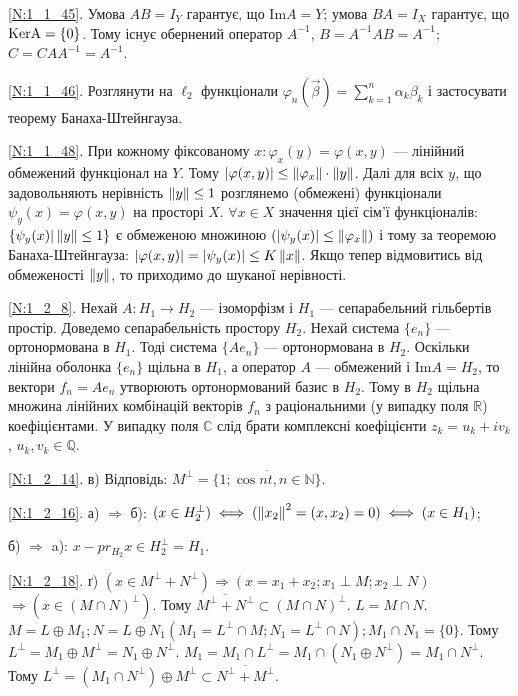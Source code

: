 \noindent\ref{N:1_1_45}. Умова $AB = I_Y$ гарантує, що $\mathrm{Im} A = Y$; умова $BA = I_X$
гарантує, що $\rm KerA = \{0\}$. Тому існує обернений оператор $A^{-1}$, $B = A^{-1}AB = A^{-1}$; $C = CAA^{-1} = A^{-1}$.

\noindent\ref{N:1_1_46}. Розглянути на $\ell_2$ функціонали $\varphi_n (\vec{\beta}) = \sum\limits_{k = 1}^{n} \alpha_k \beta_k$
і застосувати теорему Банаха-Штейнгауза.

\noindent\ref{N:1_1_48}. При кожному фіксованому $x: \varphi_x(y) = \varphi(x, y)$ --- лінійний обмежений функціонал на $Y$. Тому
$|\varphi(x, y)| \leq \left\lVert\varphi_x\right\rVert \cdot \left\lVert y\right\rVert$. Далі для всіх $y$, що задовольняють нерівність $\left\lVert y\right\rVert \leq 1$
розглянемо (обмежені) функціонали $\psi_y (x) = \varphi(x, y)$ на просторі $X$. $\forall x \in X$ значення цієї
сім'ї функціоналів: $\{\psi_y (x) | \left\lVert y\right\rVert \leq 1\}$ є обмеженою множиною $(|\psi_y(x)| \leq \left\lVert\varphi_x\right\rVert)$ і тому за теоремою
Банаха-Штейнгауза: $|\varphi(x, y)| = |\psi_y(x)| \leq K\left\lVert x\right\rVert$. Якщо тепер відмовитись від обмеженості $\left\lVert y\right\rVert$, то приходимо до
шуканої нерівності.

\noindent\ref{N:1_2_8}. Нехай $A: H_1 \to H_2$ --- ізоморфізм і $H_1$ --- сепарабельний
гільбертів простір. Доведемо сепарабельність простору $H_2$. Нехай система $\{e_n\}$ ---
ортонормована в $H_1$. Тоді система $\{A e_n\}$ --- ортонормована в $H_2$. Оскільки
лінійна оболонка $\{e_n\}$ щільна в $H_1$, а оператор $A$ --- обмежений і $\mathrm{Im}A = H_2$,
то вектори $f_n = A e_n$ утворюють ортонормований базис в $H_2$. Тому в $H_2$ щільна
множина лінійних комбінацій векторів $f_n$ з раціональними (у випадку поля $\mathbb{R}$)
коефіцієнтами. У випадку поля $\mathbb{C}$ слід брати комплексні коефіцієнти
$z_k = u_k + i v_k$, $u_k, v_k \in \mathbb{Q}$.

\noindent\ref{N:1_2_14}. в) Відповідь: $M^{\perp} = \overline{\{1; \cos nt, n \in \mathbb{N} \}}$.

\noindent\ref{N:1_2_16}. а) $\Rightarrow$ б): 
$(x \in H_2^{\perp}) \iff (\left\lVert x_2\right\rVert^2 = (x, x_2) = 0) \iff (x \in H_1)$;

\noindent б) $\Rightarrow$ a): $x - pr_{H_2} x \in H_2^{\perp} = H_1$.

\noindent\ref{N:1_2_18}. ґ) $(x \in M^{\perp}+N^{\perp}) \Rightarrow (x = x_1+x_2; x_1 \perp M; x_2 \perp N)$
$\Rightarrow (x \in (M \cap N)^{\perp})$. Тому $\overline{M^{\perp} + N^{\perp}} \subset (M \cap N)^{\perp}$.
$L = M \cap N$. $M = L \oplus  M_1; N = L \oplus N_1 (M_1 = L^{\perp} \cap M; N_1 = L^{\perp} \cap N); M_1 \cap N_1 = \{0\}$.
Тому $L^{\perp} = M_1 \oplus M^{\perp} = N_1 \oplus N^{\perp}$. 
$M_1 = M_1 \cap L^{\perp} = M_1 \cap (N_1 \oplus N^{\perp}) = M_1 \cap N^{\perp}$. 
Тому $L^{\perp} = (M_1 \cap N^{\perp}) \oplus M^{\perp} \subset \overline{N^{\perp} + M^{\perp}}$.


